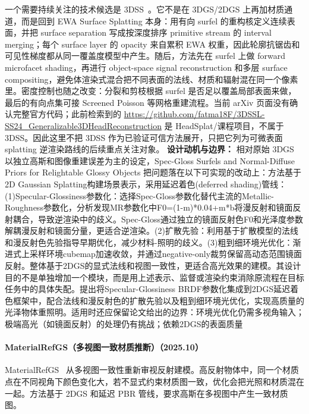 一个需要持续关注的技术候选是 3DSS~\cite{2605_05876}。它不是在 3DGS/2DGS 上再加材质通道，而是回到 EWA Surface Splatting 本身：用有向 surfel 的重构核定义连续表面，并把 surface separation 写成按深度排序 primitive stream 的 interval merging；每个 surface layer 的 opacity 来自累积 EWA 权重，因此轮廓抗锯齿和可见性梯度都从同一覆盖度模型中产生。随后，方法先在 surfel 上做 forward microfacet shading，再进行 object-space signal reconstruction 和多层 surface compositing，避免体渲染式混合把不同表面的法线、材质和辐射混在同一个像素里。密度控制也随之改变：分裂和剪枝根据 surfel 是否足以覆盖局部表面来做，最后的有向点集可接 Screened Poisson 等网格重建流程。当前 arXiv 页面没有确认完整官方代码；此前检索到的 \url{https://github.com/fatma18F/3DSSL-SS24_Generalizable3DHeadReconstruction} 是 HeadSplat/课程项目，不属于 3DSS。因此这里不把 3DSS 作为已验证可信方法展开，只把它列为可微表面 splatting 逆渲染路线的后续重点关注对象。
\textbf{设计动机与边界：} 相对原始 3DGS 以独立高斯和图像重建误差为主的设定，Spec-Gloss Surfels and Normal-Diffuse Priors for Relightable Glossy Objects 把问题落在以下可实现的改动上：方法基于2D Gaussian Splatting构建场景表示，采用延迟着色(deferred shading)管线：(1)Specular-Glossiness参数化：选择Spec-Gloss参数化替代主流的Metallic-Roughness参数化，分析发现MR参数化中F0=(1-m)*0.04+m*b将漫反射和镜面反射耦合，导致逆渲染中的歧义。Spec-Gloss通过独立的镜面反射色F0和光泽度参数解耦漫反射和镜面分量，更适合逆渲染。(2)扩散先验：利用基于扩散模型的法线和漫反射色先验指导早期优化，减少材料-照明的歧义。(3)粗到细环境光优化：渐进式上采样环境cubemap加速收敛，并通过negative-only裁剪保留高动态范围镜面反射。整体基于2DGS的显式法线和视图一致性，更适合高光效果的建模。其设计目的不是单独增加一个模块，而是用上述表示、监督或渲染约束消除原流程在目标任务中的具体失配。提出将Specular-Glossiness BRDF参数化集成到2DGS延迟着色框架中，配合法线和漫反射色的扩散先验以及粗到细环境光优化，实现高质量的光泽物体重照明。适用时还应保留论文给出的边界：环境光优化仍需多视角输入；极端高光（如镜面反射）的处理仍有挑战；依赖2DGS的表面质量
\paragraph{MaterialRefGS（多视图一致材质推断）（2025.10）}
MaterialRefGS~\cite{2510_11387} 从多视图一致性重新审视反射建模。高反射物体中，同一个材质点在不同视角下颜色变化大，若不显式约束材质图一致，优化会把光照和材质混在一起。方法基于 2DGS 和延迟 PBR 管线，要求高斯在多视图中产生一致材质图。


